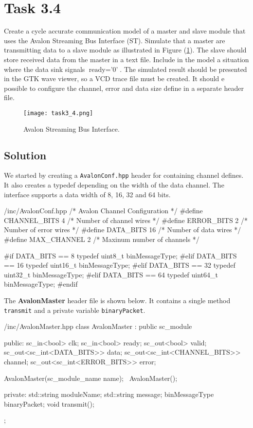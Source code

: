 \documentclass[../main.tex]{subfiles}
\begin{document}
\section{Task 3.4}

Create a cycle accurate communication model of a master and slave module that uses the Avalon Streaming Bus Interface (ST). Simulate that a master are transmitting data to a slave module as illustrated in Figure (\ref{fig:avalon}). The slave should store received data from the master in a text file. Include in the model a situation where the data sink signals $\text{ready} = \text{'0'}$. The simulated result should be presented in the GTK wave viewer, so a VCD trace file must be created. It should e possible to configure the channel, error and data size define in a separate header file.

\begin{figure}[h]
    \centering
    \texttt{[image: task3\_4.png]}
    \caption{Avalon Streaming Bus Interface.}
    \label{fig:avalon}
\end{figure}

\subsection*{Solution}

We started by creating a \texttt{AvalonConf.hpp} header for containing channel defines. It also creates a typedef depending on the width of the data channel. The interface supports a data width of 8, 16, 32 and 64 bits.

\begin{myminted}{/inc/AvalonConf.hpp}
/* Avalon Channel Configuration */
#define CHANNEL_BITS    4   /* Number of channel wires      */
#define ERROR_BITS      2   /* Number of error wires        */
#define DATA_BITS       16  /* Number of data wires         */
#define MAX_CHANNEL     2   /* Maxinum number of channels   */

#if DATA_BITS == 8
typedef uint8_t binMessageType;
#elif DATA_BITS == 16
typedef uint16_t binMessageType;
#elif DATA_BITS == 32
typedef uint32_t binMessageType;
#elif DATA_BITS == 64
typedef uint64_t binMessageType;
#endif
\end{myminted}

\newpage

The \textbf{AvalonMaster} header file is shown below. It contains a single method \texttt{transmit} and a private variable \texttt{binaryPacket}.

\begin{myminted}{/inc/AvalonMaster.hpp}
class AvalonMaster : public sc_module {
public:
    sc_in<bool>                     clk;
    sc_in<bool>                     ready;
    sc_out<bool>                    valid;
    sc_out<sc_int<DATA_BITS>>       data;
    sc_out<sc_int<CHANNEL_BITS>>    channel;
    sc_out<sc_int<ERROR_BITS>>      error;

    AvalonMaster(sc_module_name name);
    ~AvalonMaster();

private:
    std::string moduleName;
    std::string message;
    binMessageType binaryPacket;
    void transmit();
};
\end{myminted}
\end{document}
